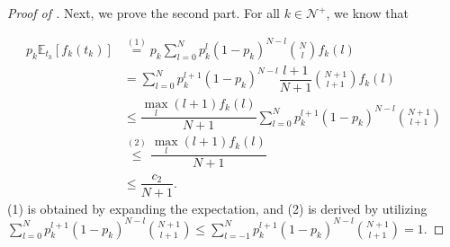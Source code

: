 \documentclass[10pt,a4paper]{amsart}
\newcommand{\dataerror}{\mathsf{Red}_D}
\begin{document}
\begin{proof}[Proof of ]
    Next, we prove the second part. For all $k\in \mathcal{N}^+$, we know that 

    
    \begin{align*}
        p_k\mathbb{E}_{t_k}[f_k(t_k)] &\overset{(1)}{=} p_k\sum\limits_{l=0}^N p_k^l (1-p_k)^{N-l}\binom{N}{l}f_k(l) \\
        &= \sum\limits_{l=0}^N p_k^{l+1} (1-p_k)^{N-l}\dfrac{l+1}{N+1}\binom{N+1}{l+1}f_k(l) \\
        &\le \dfrac{\max\limits_{l} (l+1)f_k(l)}{N+1}\sum\limits_{l=0}^N p_k^{l+1} (1-p_k)^{N-l}\binom{N+1}{l+1} \\
        &\overset{(2)}{\le} \dfrac{\max\limits_{l} (l+1)f_k(l)}{N+1}\\ &\le \dfrac{c_2}{N+1}.
    \end{align*}
    (1) is obtained by expanding the expectation, and (2) is derived by utilizing 
    \\
    $\sum\limits_{l=0}^N p_k^{l+1} (1-p_k)^{N-l}\binom{N+1}{l+1}\le \sum\limits_{l=-1}^N p_k^{l+1} (1-p_k)^{N-l}\binom{N+1}{l+1}=1.$


\end{proof}
\end{document}
